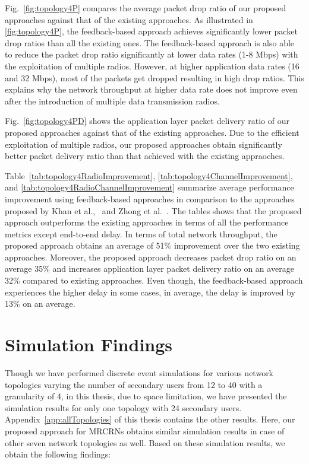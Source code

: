 




Fig.~\ref{fig:topology4P} compares the average packet drop ratio of our proposed approaches against that of the existing approaches.  As illustrated in \cref{fig:topology4P}, the feedback-based approach achieves significantly lower packet drop ratios than all the existing ones. The feedback-based approach is also able to reduce the packet drop ratio significantly at lower data rates (1-8 Mbps) with the exploitation of multiple radios. However, at higher application data rates (16 and 32 Mbps), most of the packets get dropped resulting in high drop ratios. This explains why the network throughput at higher data rate does not improve even after the introduction of multiple data transmission radios.

Fig.~\ref{fig:topology4PD} shows the application layer packet delivery ratio of our proposed approaches against that of the existing approaches. Due to the efficient exploitation of multiple radios, our proposed approaches obtain significantly better packet delivery ratio than that achieved with the existing appraoches.

Table~\ref{tab:topology4RadioImprovement}, \ref{tab:topology4ChannelImprovement}, and \ref{tab:topology4RadioChannelImprovement} summarize average performance improvement using feedback-based approaches in comparison to the approaches proposed by Khan et al.,~\cite{khan2015towards} and Zhong et al.~\cite{zhong2014capacity}. The tables shows that the proposed approach outperforms the existing approaches in terms of all the performance metrics except end-to-end delay. In terms of total network throughput, the proposed approach obtains an average of 51\% improvement over the two existing approaches. Moreover, the proposed approach decreases packet drop ratio on an average 35\% and increases application layer packet delivery ratio on an average 32\% compared to existing approaches. Even though, the feedback-based approach experiences the higher delay in some cases, in average, the delay is improved by 13\% on an average.
%



\section{Simulation Findings}

Though we have performed discrete event simulations for various network topologies varying the number of secondary users from 12 to 40 with a granularity of 4, in this thesis, due to space limitation, we have presented the simulation results for only one topology with 24 secondary users. Appendix~\ref{app:allTopologies} of this thesis contains the other results. Here, our proposed approach for MRCRNs obtains similar simulation results in case of other seven network topologies as well. Based on these simulation results, we obtain the following findings:

